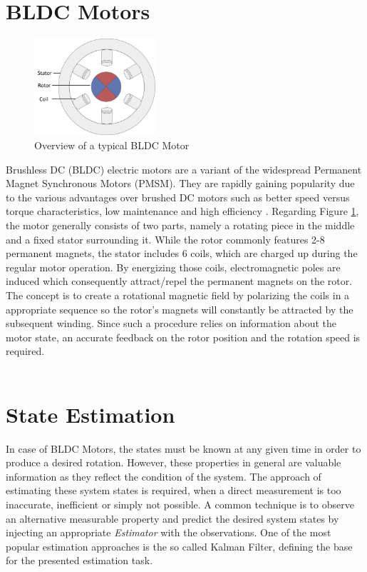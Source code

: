 \documentclass[english]{isasthesis}
\begin{document}
    	\section{BLDC Motors}
    	 \begin{figure}
                \begin{center}
                \includegraphics[width=0.4\textwidth]{figures/BLDC-Motor_1.jpg}
                \end{center}
                \caption{Overview of a typical BLDC Motor}
                \label{fig:bldc}
          \end{figure}
         Brushless DC (BLDC) electric motors are a variant of the widespread Permanent Magnet Synchronous Motors (PMSM). They are rapidly gaining popularity due to the various advantages over brushed DC motors such as better speed versus torque characteristics, low maintenance and high efficiency \cite{welekar2014development}. Regarding Figure \ref{fig:bldc}, the motor generally consists of two parts, namely a rotating piece in the middle and a fixed stator surrounding it. While the rotor commonly features 2-8 permanent magnets, the stator includes 6 coils, which are charged up during the regular motor operation. By energizing those coils, electromagnetic poles are induced which consequently attract/repel the permanent magnets on the rotor. The concept is to create a rotational magnetic field by polarizing the coils in a appropriate sequence so the rotor's magnets will constantly be attracted by the subsequent winding. Since such a procedure relies on information about the motor state, an accurate feedback on the rotor position and the rotation speed is required.\\ \\
    	\section{State Estimation}
    	 In case of BLDC Motors, the states must be known at any given time in order to produce a desired rotation. However, these properties in general are valuable information as they reflect the condition of the system. The approach of estimating these system states is required, when a direct measurement is too inaccurate, inefficient or simply not possible. A common technique is to observe an alternative measurable property and predict the desired system states by injecting an appropriate \textit{Estimator} with the observations. One of the most popular estimation approaches is the so called Kalman Filter, defining the base for the presented estimation task. 
\end{document}
